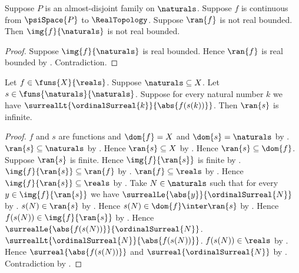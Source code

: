 \begin{corollary}\label{psi_unbounded_continuous_map_unbounded_on_naturals}
    Suppose $P$ is an almost-disjoint family on $\naturals$.
    Suppose $f$ is continuous from $\psiSpace{P}$ to $\RealTopology$.
    Suppose $\ran{f}$ is not real bounded.
    Then $\img{f}{\naturals}$ is not real bounded.
\end{corollary}
\begin{proof}
    Suppose $\img{f}{\naturals}$ is real bounded.
    Hence $\ran{f}$ is real bounded by
        .
    Contradiction.
\end{proof}

\begin{lemma}\label{large_value_choice_range_is_infinite}
    Let $f\in\funs{X}{\reals}$.
    Suppose $\naturals\subseteq X$.
    Let $s\in\funs{\naturals}{\naturals}$.
    Suppose for every natural number $k$ we have
        $\surrealLt{\ordinalSurreal{k}}{\abs{f(s(k))}}$.
    Then $\ran{s}$ is infinite.
\end{lemma}
\begin{proof}
    $f$ and $s$ are functions and $\dom{f}=X$ and
        $\dom{s}=\naturals$ by .
    $\ran{s}\subseteq\naturals$ by .
    Hence $\ran{s}\subseteq X$ by .
    Hence $\ran{s}\subseteq\dom{f}$.
    Suppose $\ran{s}$ is finite.
    Hence $\img{f}{\ran{s}}$ is finite by
        .
    $\img{f}{\ran{s}}\subseteq\ran{f}$ by
        .
    $\ran{f}\subseteq\reals$ by .
    Hence $\img{f}{\ran{s}}\subseteq\reals$ by
        .
    Take $N\in\naturals$ such that for every
        $y\in\img{f}{\ran{s}}$ we have
            $\surrealLe{\abs{y}}{\ordinalSurreal{N}}$
        by .
    $s(N)\in\ran{s}$ by .
    Hence $s(N)\in\dom{f}\inter\ran{s}$ by .
    Hence $f(s(N))\in\img{f}{\ran{s}}$ by
        .
    Hence $\surrealLe{\abs{f(s(N))}}{\ordinalSurreal{N}}$.
    $\surrealLt{\ordinalSurreal{N}}{\abs{f(s(N))}}$.
    $f(s(N))\in\reals$ by .
    Hence $\surreal{\abs{f(s(N))}}$ and
        $\surreal{\ordinalSurreal{N}}$ by
        .
    Contradiction by .
\end{proof}

